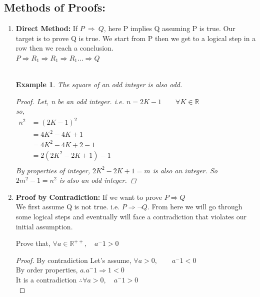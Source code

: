 \documentclass{article}
\newtheorem{example}{Example}[section]
\newcommand{\Rw}{\Rightarrow}
\newcommand{\hs}{\hspace}
\begin{document}
\subsection{Methods of Proofs:}
\begin{enumerate}
    \item \textbf{Direct Method:} If $P\ \Rw \ Q$, here P implies Q assuming P is true. Our target is to prove Q is true. We start from P then we get to a logical step in a row then we reach a conclusion.\\
    $P \Rw R_1 \Rw R_1 \Rw R_1 ... \Rw Q$\\\\
    \begin{example}
        The square of an odd integer is also odd.
        \begin{proof}
            Let, n be an odd integer. i.e. $n=2K-1 \qquad \forall K \in \mathbb{R} $ \\
            so,
            \begin{align*}
                n^2 &= (2K-1)^2 \hs{12cm}\\
                &= 4K^2-4K+1\\
                &= 4K^2-4K+2-1\\
                &= 2(2K^2-2K+1)-1\\
            \end{align*}
            By properties of integer, $2K^2-2K+1=m$ is also an integer. So $2m^2-1=n^2$ is also an odd integer.
        \end{proof}
    \end{example} 
    \item \textbf{Proof by Contradiction: } If we want to prove $P \Rw Q$ \\
        We first assume Q is not true. i.e. $P \Rw \neg Q$. From here we will go through some logical steps and eventually will face a contradiction that violates our initial assumption.
    \begin{theorem}{\empty}{\empty}
        Prove that, $\forall a \in \mathbb{R^{++}},\quad a^-1>0$
        \begin{proof}{By contradiction}
        Let's assume, $\forall a> 0, \qquad a^-1<0$\\
           By order properties, $a.a^-1 \Rw 1<0$ \\
           It is a contradiction $\therefore \forall a >0, \quad a^-1>0$\\
                \end{proof}
    \end{theorem}

\end{enumerate}
\end{document}

